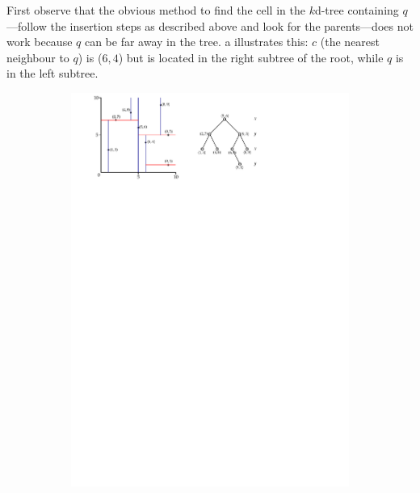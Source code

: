 First observe that the obvious method to find the cell in the $k$d-tree containing $q$---follow the insertion steps as described above and look for the parents---does not work because $q$ can be far away in the tree.
a illustrates this: $c$ (the nearest neighbour to $q$) is ($6,4$) but is located in the right subtree of the root, while $q$ is in the left subtree.
\begin{figure}
  \centering
  \begin{subfigure}[b]{0.6\linewidth}
    \centering
    \includegraphics[page=2,width=\textwidth]{figs/kdtree_nn.pdf}
    \caption{}
  \end{subfigure}
  \begin{subfigure}[b]{0.6\linewidth}
    \centering

\end{subfigure}
\end{figure}

